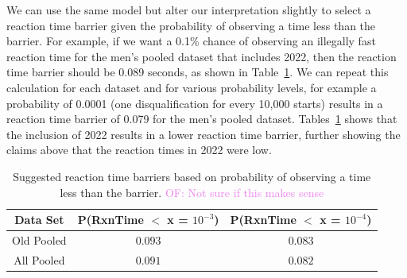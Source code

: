 \documentclass[12pt, letterpaper, titlepage]{article}
\newcommand{\of}[1]{\textcolor{violet}{OF: #1}}
\begin{document}
We can use the same model but alter our interpretation slightly to select a 
reaction time barrier given the probability of observing a time less than the 
barrier.  For example, if we want a 0.1\% chance of observing an illegally fast 
reaction time for the men's pooled dataset that includes 2022, then the reaction
time barrier should be 0.089 seconds, as shown in Table~\ref{tab:Sim_time}.  We
can repeat this calculation for each dataset and for various probability levels,
for example a probability of 0.0001 (one disqualification for every 10,000 starts)
results in a reaction time barrier of 0.079 for the men's pooled dataset.  
Tables~\ref{tab:Sim_time} shows that the inclusion of 2022 results in a lower
reaction time barrier, further showing the claims above that the reaction times
in 2022 were low.


\begin{table}
  \centering
  \caption{Suggested reaction time barriers based on probability of observing
  a time less than the barrier. \of{Not sure if this makes sense}}
  \begin{tabular}{c c c} 
   \toprule
   Data Set & P(RxnTime $<$ x = $10^{-3}$) & P(RxnTime $<$ x = $10^{-4}$) \\ 
   \midrule
   Old Pooled & $0.093$ & $0.083$ \\ 
   All Pooled & $0.091$ & $0.082$ \\
   \bottomrule
  \end{tabular}
  \label{tab:Sim_time}
\end{table}


\end{document}
